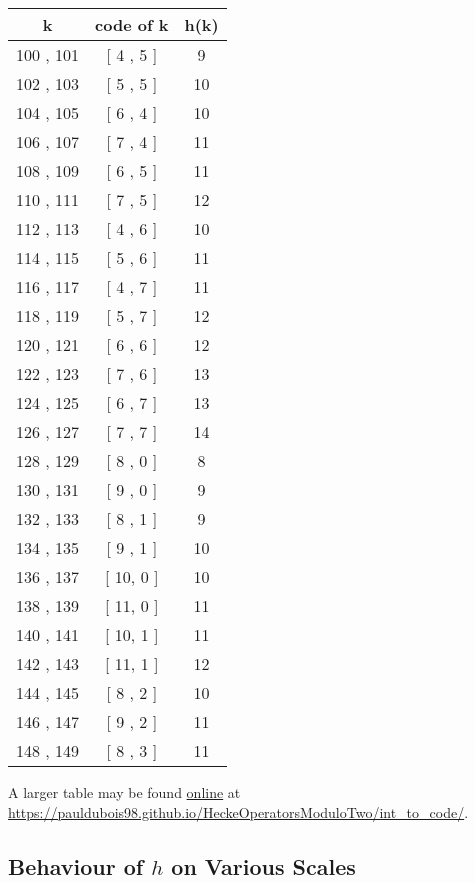 \begin{center}
\begin{multicols}{3}
		\begin{tabular}{|c|c|c|}
			\hline
			\textbf{k} & \textbf{code of k} & \textbf{h(k)} \\
			\hline
			100 , 101 & [ 4 , 5 ] & 9 \\
			102 , 103 & [ 5 , 5 ] & 10 \\
			104 , 105 & [ 6 , 4 ] & 10 \\
			106 , 107 & [ 7 , 4 ] & 11 \\
			108 , 109 & [ 6 , 5 ] & 11 \\
			110 , 111 & [ 7 , 5 ] & 12 \\
			112 , 113 & [ 4 , 6 ] & 10 \\
			114 , 115 & [ 5 , 6 ] & 11 \\
			116 , 117 & [ 4 , 7 ] & 11 \\
			118 , 119 & [ 5 , 7 ] & 12 \\
			120 , 121 & [ 6 , 6 ] & 12 \\
			122 , 123 & [ 7 , 6 ] & 13 \\
			124 , 125 & [ 6 , 7 ] & 13 \\
			126 , 127 & [ 7 , 7 ] & 14 \\
			128 , 129 & [ 8 , 0 ] & 8 \\
			130 , 131 & [ 9 , 0 ] & 9 \\
			132 , 133 & [ 8 , 1 ] & 9 \\
			134 , 135 & [ 9 , 1 ] & 10 \\
			136 , 137 & [ 10, 0 ] & 10 \\
			138 , 139 & [ 11, 0 ] & 11 \\
			140 , 141 & [ 10, 1 ] & 11 \\
			142 , 143 & [ 11, 1 ] & 12 \\
			144 , 145 & [ 8 , 2 ] & 10 \\
			146 , 147 & [ 9 , 2 ] & 11 \\
			148 , 149 & [ 8 , 3 ] & 11 \\
			\hline
		\end{tabular}
	\end{multicols}
\end{center}
A larger table may be found \href{https://pauldubois98.github.io/HeckeOperatorsModuloTwo/int_to_code/}{online} at \url{https://pauldubois98.github.io/HeckeOperatorsModuloTwo/int_to_code/}.



\newpage
\subsection{Behaviour of $h$ on Various Scales}
\label{plot:Behaviour_h}
